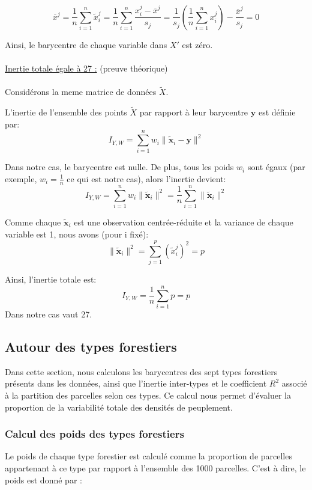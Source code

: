\documentclass{article}
\begin{document}
\[
\overline{x}^j = \frac{1}{n} \sum_{i=1}^n \tilde{x}_{i}^j = \frac{1}{n} \sum_{i=1}^n \frac{x_{i}^j - \overline{x}^j}{s_j} = \frac{1}{s_j} \left(\frac{1}{n} \sum_{i=1}^n x_{i}^j\right) - \frac{\overline{x}^j}{s_j} = 0
\]

Ainsi, le barycentre de chaque variable dans $X'$ est zéro.
\\
\\

\underline{Inertie totale égale à 27 :} (preuve théorique)
\\
\\
Considérons la meme matrice de données $\tilde{X}$.


L'inertie de l'ensemble des points $\tilde{X}$ par rapport à leur barycentre $\mathbf{y}$ est définie par:
\[
I_{Y, W} = \sum_{i=1}^n w_i \|\mathbf{\tilde{x}}_i - \mathbf{y}\|^2
\]

Dans notre cas, le barycentre est nulle.
De plus, tous les poids $w_i$ sont égaux (par exemple, $w_i = \frac{1}{n}$ ce qui est notre cas), alors l'inertie devient:
\[
I_{Y, W} = \sum_{i=1}^n w_i \|\mathbf{\tilde{x}}_i\|^2 = \frac{1}{n} \sum_{i=1}^n \|\mathbf{\tilde{x}}_i\|^2 
\]

Comme chaque $\mathbf{\tilde{x}}_i$ est une observation centrée-réduite et la variance de chaque variable est 1, nous avons (pour i fixé):
\[
\|\mathbf{\tilde{x}}_i\|^2 = \sum_{j=1}^p (\tilde{x}_{i}^j)^2 = p
\]

Ainsi, l'inertie totale est:
\[
I_{Y, W} = \frac{1}{n} \sum_{i=1}^n p = p 
\]
Dans notre cas vaut 27.

\subsection{Autour des types forestiers}

Dans cette section, nous calculons les barycentres des sept types forestiers présents dans les données, ainsi que l'inertie inter-types et le coefficient $R^2$ associé à la partition des parcelles selon ces types. Ce calcul nous permet d'évaluer la proportion de la variabilité totale des densités de peuplement.

\subsubsection{Calcul des poids des types forestiers}
Le poids de chaque type forestier est calculé comme la proportion de parcelles appartenant à ce type par rapport à l'ensemble des 1000 parcelles. C'est à dire, le poids est donné par :
\end{document}
